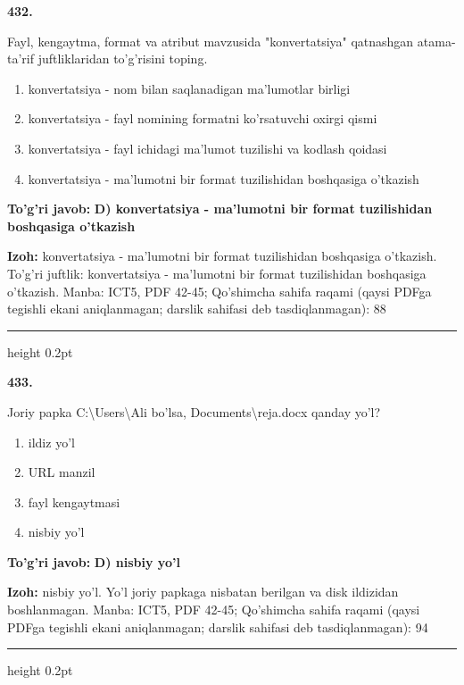 \documentclass[10pt,a4paper]{article}
\begin{document}
{\bfseries\sffamily\color{ink} 432.}
\par
Fayl, kengaytma, format va atribut mavzusida "konvertatsiya" qatnashgan atama-ta'rif juftliklaridan to'g'risini toping.
\begin{enumerate}[label=\Alph*),leftmargin=9mm]
\item konvertatsiya - nom bilan saqlanadigan ma'lumotlar birligi
\item konvertatsiya - fayl nomining formatni ko'rsatuvchi oxirgi qismi
\item konvertatsiya - fayl ichidagi ma'lumot tuzilishi va kodlash qoidasi
\item konvertatsiya - ma'lumotni bir format tuzilishidan boshqasiga o'tkazish
\end{enumerate}
\begin{tcolorbox}[enhanced,breakable,colback=teal!4,colframe=teal!60!black,boxrule=0.45pt,arc=1.2mm,left=2.7mm,right=2.7mm,top=1.8mm,bottom=1.8mm,before skip=2mm,after skip=2mm]
{\bfseries\sffamily\color{teal}To'g'ri javob:} \textbf{D) konvertatsiya - ma'lumotni bir format tuzilishidan boshqasiga o'tkazish}
\par\smallskip
{\bfseries Izoh:} konvertatsiya - ma'lumotni bir format tuzilishidan boshqasiga o'tkazish. To'g'ri juftlik: konvertatsiya - ma'lumotni bir format tuzilishidan boshqasiga o'tkazish. Manba: ICT5, PDF 42-45; Qo'shimcha sahifa raqami (qaysi PDFga tegishli ekani aniqlanmagan; darslik sahifasi deb tasdiqlanmagan): 88
\end{tcolorbox}
\vspace{2mm}\hrule height 0.2pt\vspace{3mm}

{\bfseries\sffamily\color{ink} 433.}
\par
Joriy papka C:\textbackslash{}Users\textbackslash{}Ali bo'lsa, Documents\textbackslash{}reja.docx qanday yo'l?
\begin{enumerate}[label=\Alph*),leftmargin=9mm]
\item ildiz yo'l
\item URL manzil
\item fayl kengaytmasi
\item nisbiy yo'l
\end{enumerate}
\begin{tcolorbox}[enhanced,breakable,colback=teal!4,colframe=teal!60!black,boxrule=0.45pt,arc=1.2mm,left=2.7mm,right=2.7mm,top=1.8mm,bottom=1.8mm,before skip=2mm,after skip=2mm]
{\bfseries\sffamily\color{teal}To'g'ri javob:} \textbf{D) nisbiy yo'l}
\par\smallskip
{\bfseries Izoh:} nisbiy yo'l. Yo'l joriy papkaga nisbatan berilgan va disk ildizidan boshlanmagan. Manba: ICT5, PDF 42-45; Qo'shimcha sahifa raqami (qaysi PDFga tegishli ekani aniqlanmagan; darslik sahifasi deb tasdiqlanmagan): 94
\end{tcolorbox}
\vspace{2mm}\hrule height 0.2pt\vspace{3mm}
\end{document}
